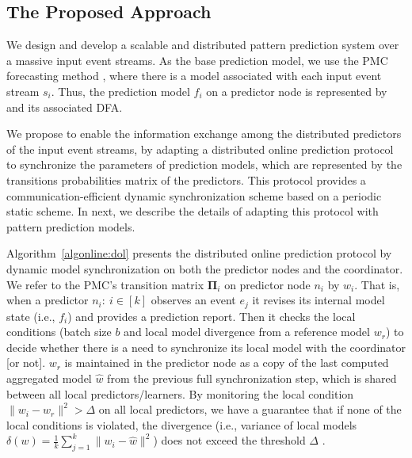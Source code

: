 %

\subsection{The Proposed Approach}
\label{sec:proposed_approach}
\par We design and develop a scalable and distributed pattern prediction system over a massive input event streams. As the base prediction model, we use the PMC forecasting method \cite{alevizos2017event}, where there is a \pmcmr model associated with each input event stream $s_i$. Thus, the prediction model $f_i$ on a predictor node is represented by \pmcmr and its associated DFA.

\par We propose to enable the information exchange among the distributed predictors of the input event streams, by adapting a distributed online prediction protocol \cite{kamp2014communication} to synchronize the parameters of prediction models, which are represented by the transitions probabilities matrix of the \pmcmr predictors. This protocol provides a communication-efficient dynamic synchronization scheme based on a periodic static scheme. In next, we  describe the details of adapting this protocol with pattern prediction models.


\par Algorithm~\ref{algonline:dol} presents the distributed online prediction protocol by dynamic model synchronization on both the predictor nodes and the coordinator. We refer to the PMC's transition matrix $\boldsymbol{\Pi}_i$ on predictor node $n_i$ by $w_i$. That is, when a predictor $n_i:\ i \in[k]$ observes an event $e_j$ it revises its internal model state (i.e., $f_i$) and provides a prediction report. Then it checks the local conditions  (batch size $b$ and local model divergence from a reference model $w_r$) to decide whether there is a need to synchronize its local model with the coordinator [or not].  $w_r$ is maintained in the predictor node as a copy of the last computed aggregated model $\hat{w}$ from the previous full synchronization step, which is shared between all local predictors/learners. By monitoring the local condition $\|w_i - w_r\|^2 > \Delta$ on all local predictors, we have a guarantee that if none of the local conditions is violated, the divergence (i.e., variance of local models $\delta(w)=\frac{1}{k} \sum_{j=1}^{k}\|w_i - \hat{w}\|^2$) does not exceed the threshold $\Delta$ \cite{kamp2014communication}. 


